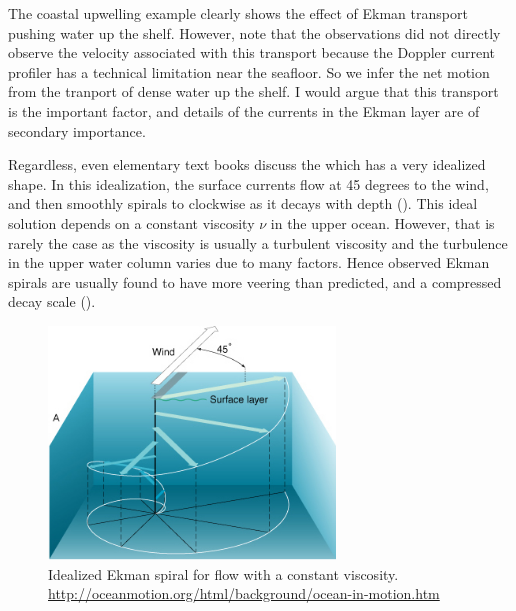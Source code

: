 The coastal upwelling example clearly shows the effect of Ekman transport pushing water up the shelf.  However, note that the observations did not directly observe the velocity associated with this transport because the Doppler current profiler has a technical limitation near the seafloor.  So we infer the net motion from the tranport of dense water up the shelf.  I would argue that this transport is the important factor, and details of the currents in the Ekman layer are of secondary importance. 

Regardless, even elementary text books discuss the  which has a very idealized shape.  In this idealization, the surface currents flow at 45 degrees to the wind, and then  smoothly spirals to clockwise as it decays with depth ().  This ideal solution depends on a constant viscosity $\nu$ in the upper ocean.  However, that is rarely the case as the viscosity is usually a turbulent viscosity and the turbulence in the upper water column varies due to many factors.  Hence observed Ekman spirals are usually found to have more veering than predicted, and a compressed decay scale ().  

\begin{figure}[hbt]
  \begin{center}
    \includegraphics[width=3in]{figs/Coriolis/ocean-in-motion_clip_image001}
    \caption{Idealized Ekman spiral for flow with a constant viscosity.  \protect\url{http://oceanmotion.org/html/background/ocean-in-motion.htm}}
    \label{fig:ocean-in-motion_clip_image001}  
  \end{center}
\end{figure}

